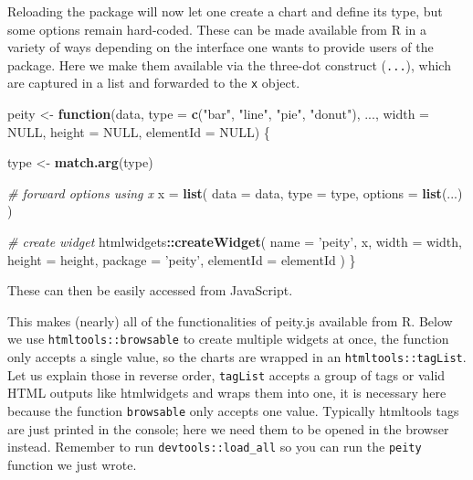 \documentclass[10pt,]{krantz}
\makeatletter
\newenvironment{Shaded}{\begin{snugshade}}{\end{snugshade}}
\newcommand{\AttributeTok}[1]{\textcolor[rgb]{0.61,0.61,0.61}{#1}}
\newcommand{\CommentTok}[1]{\textcolor[rgb]{0.37,0.37,0.37}{\textit{#1}}}
\newcommand{\ControlFlowTok}[1]{\textcolor[rgb]{0.27,0.27,0.27}{\textbf{#1}}}
\newcommand{\DataTypeTok}[1]{\textcolor[rgb]{0.27,0.27,0.27}{#1}}
\newcommand{\KeywordTok}[1]{\textcolor[rgb]{0.27,0.27,0.27}{\textbf{#1}}}
\newcommand{\NormalTok}[1]{#1}
\newcommand{\OperatorTok}[1]{\textcolor[rgb]{0.43,0.43,0.43}{\textbf{#1}}}
\newcommand{\OtherTok}[1]{\textcolor[rgb]{0.37,0.37,0.37}{#1}}
\newcommand{\StringTok}[1]{\textcolor[rgb]{0.5,0.5,0.5}{#1}}
\newcommand{\VariableTok}[1]{\textcolor[rgb]{0,0,0}{#1}}
\newenvironment{kframe}{%
\medskip{}
\setlength{\fboxsep}{.8em}
 \def\at@end@of@kframe{}%
 \ifinner\ifhmode%
  \def\at@end@of@kframe{\end{minipage}}%
  \begin{minipage}{\columnwidth}%
 \fi\fi%
 \def\FrameCommand##1{\hskip\@totalleftmargin \hskip-\fboxsep
 \colorbox{shadecolor}{##1}\hskip-\fboxsep
     \hskip-\linewidth \hskip-\@totalleftmargin \hskip\columnwidth}%
 \MakeFramed {\advance\hsize-\width
   \@totalleftmargin\z@ \linewidth\hsize
   \@setminipage}}%
 {\par\unskip\endMakeFramed%
 \at@end@of@kframe}
\renewenvironment{Shaded}{\begin{kframe}}{\end{kframe}}
\makeatother
\begin{document}
Reloading the package will now let one create a chart and define its type, but some options remain hard-coded. These can be made available from R in a variety of ways depending on the interface one wants to provide users of the package. Here we make them available via the three-dot construct (\texttt{...}), which are captured in a list and forwarded to the \texttt{x} object.

\begin{Shaded}
\begin{Highlighting}[]
\NormalTok{peity <-}\StringTok{ }\ControlFlowTok{function}\NormalTok{(data, }\DataTypeTok{type =} \KeywordTok{c}\NormalTok{(}\StringTok{"bar"}\NormalTok{, }\StringTok{"line"}\NormalTok{, }\StringTok{"pie"}\NormalTok{, }\StringTok{"donut"}\NormalTok{), }
\NormalTok{  ..., }\DataTypeTok{width =} \OtherTok{NULL}\NormalTok{, }\DataTypeTok{height =} \OtherTok{NULL}\NormalTok{, }\DataTypeTok{elementId =} \OtherTok{NULL}\NormalTok{) \{}

\NormalTok{  type <-}\StringTok{ }\KeywordTok{match.arg}\NormalTok{(type)}

  \CommentTok{# forward options using x}
\NormalTok{  x =}\StringTok{ }\KeywordTok{list}\NormalTok{(}
    \DataTypeTok{data =}\NormalTok{ data,}
    \DataTypeTok{type =}\NormalTok{ type,}
    \DataTypeTok{options =} \KeywordTok{list}\NormalTok{(...)}
\NormalTok{  )}

  \CommentTok{# create widget}
\NormalTok{  htmlwidgets}\OperatorTok{::}\KeywordTok{createWidget}\NormalTok{(}
    \DataTypeTok{name =} \StringTok{'peity'}\NormalTok{,}
\NormalTok{    x,}
    \DataTypeTok{width =}\NormalTok{ width,}
    \DataTypeTok{height =}\NormalTok{ height,}
    \DataTypeTok{package =} \StringTok{'peity'}\NormalTok{,}
    \DataTypeTok{elementId =}\NormalTok{ elementId}
\NormalTok{  )}
\NormalTok{\}}
\end{Highlighting}
\end{Shaded}

These can then be easily accessed from JavaScript.

\begin{Shaded}
\end{Shaded}

This makes (nearly) all of the functionalities of peity.js available from R. Below we use \texttt{htmltools::browsable} to create multiple widgets at once, the function only accepts a single value, so the charts are wrapped in an \texttt{htmltools::tagList}. Let us explain those in reverse order, \texttt{tagList} accepts a group of tags or valid HTML outputs like htmlwidgets and wraps them into one, it is necessary here because the function \texttt{browsable} only accepts one value. Typically htmltools tags are just printed in the console; here we need them to be opened in the browser instead. Remember to run \texttt{devtools::load\_all} so you can run the \texttt{peity} function we just wrote.
\end{document}
